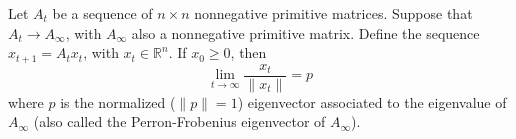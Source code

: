 \documentclass[12pt]{article}
\begin{document}
Let $A_t$ be a sequence of $n\times n$ nonnegative primitive matrices. Suppose that $A_t\to A_\infty$, with $A_\infty$ also a nonnegative primitive matrix. Define the sequence $x_{t+1}=A_tx_t$, with $x_t\in\mathbb{R}^n$. 
If $x_0\geq 0$, then
\[
\lim_{t\to\infty} \frac{x_t}{\|x_t\|} =p
\]
where $p$ is the normalized ($\|p\|=1$) eigenvector associated to the  eigenvalue of $A_\infty$ (also called the Perron-Frobenius eigenvector of $A_\infty$).
\end{document}
